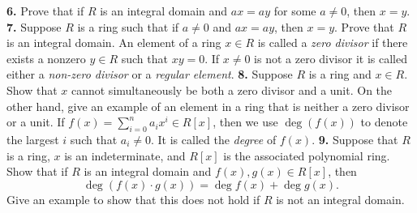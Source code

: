 \documentclass[10pt]{amsart}
\theoremstyle{theorem}
\begin{document}
{\bf 6.}  Prove that if $R$ is an integral domain and $ax = ay$ for some $a \neq 0$, then $x = y$.  
\newpage
\noindent
{\bf 7.}  Suppose $R$ is a ring such that if $a \neq 0$ and $ax = ay$, then $x = y$.  Prove that $R$ is an integral domain.
\vskip 150pt
An element of a ring $x \in R$ is called a \emph{zero divisor} if there exists a nonzero $y \in R$ such that $xy = 0$.   If $x \neq 0$ is not a zero divisor it is called either a \emph{non-zero divisor} or a \emph{regular element}.
\vskip 3pt
\noindent
{\bf 8.}  Suppose $R$ is a ring and $x \in R$.  Show that $x$ cannot simultaneously be both a zero divisor and a unit.  On the other hand, give an example of an element in a ring that is neither a zero divisor or a unit.
\newpage
If $f(x) = \sum_{i = 0}^n a_i x^i \in R[x]$, then we use $\deg(f(x))$ to denote the largest $i$ such that $a_i \neq 0$.  It is called the \emph{degree} of $f(x)$.
\vskip 3pt
\noindent
{\bf 9.}  Suppose that $R$ is a ring, $x$ is an indeterminate, and $R[x]$ is the associated polynomial ring.  
\vskip 3pt
Show that if $R$ is an integral domain and $f(x), g(x) \in R[x]$, then 
\[
    \deg (f(x) \cdot g(x)) = \deg f(x) + \deg g(x).
\]
Give an example to show that this does not hold if $R$ is not an integral domain.
\end{document}
